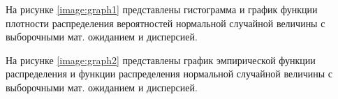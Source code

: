 На рисунке \ref{image:graph1} представлены гистограмма и график функции плотности распределения вероятностей нормальной случайной величины с выборочными мат. ожиданием и дисперсией.
\begin{figure}[h]
\end{figure}

\clearpage
На рисунке \ref{image:graph2} представлены график эмпирической функции распределения и функции распределения нормальной случайной величины с выборочными мат. ожиданием и дисперсией.
\begin{figure}[h]
\end{figure}

